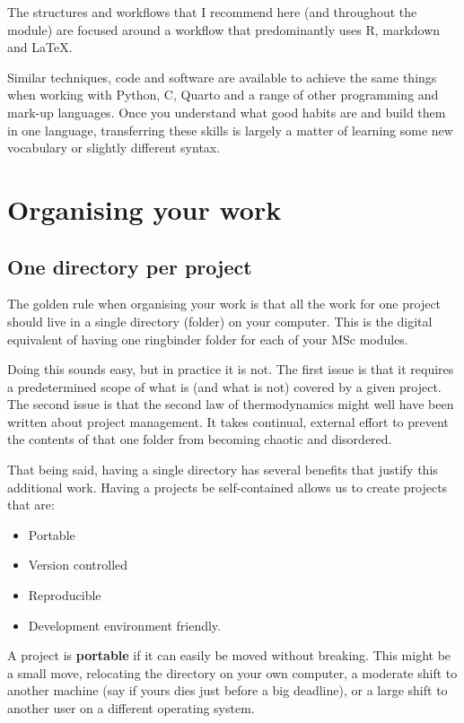\documentclass[
  12pt,
]{book}
\providecommand{\tightlist}{%
  \setlength{\itemsep}{0pt}\setlength{\parskip}{0pt}}
\theoremstyle{definition}
\theoremstyle{definition}
\theoremstyle{definition}
\theoremstyle{definition}
\theoremstyle{remark}
\begin{document}
The structures and workflows that I recommend here (and throughout the module) are focused around a workflow that predominantly uses R, markdown and LaTeX.

Similar techniques, code and software are available to achieve the same things when working with Python, C, Quarto and a range of other programming and mark-up languages. Once you understand what good habits are and build them in one language, transferring these skills is largely a matter of learning some new vocabulary or slightly different syntax.

\hypertarget{organising-your-work}{%
\section{Organising your work}\label{organising-your-work}}

\hypertarget{one-directory-per-project}{%
\subsection{One directory per project}\label{one-directory-per-project}}

The golden rule when organising your work is that all the work for one project should live in a single directory (folder) on your computer. This is the digital equivalent of having one ringbinder folder for each of your MSc modules.

Doing this sounds easy, but in practice it is not. The first issue is that it requires a predetermined scope of what is (and what is not) covered by a given project. The second issue is that the second law of thermodynamics might well have been written about project management. It takes continual, external effort to prevent the contents of that one folder from becoming chaotic and disordered.

That being said, having a single directory has several benefits that justify this additional work. Having a projects be self-contained allows us to create projects that are:

\begin{itemize}
\tightlist
\item
  Portable
\item
  Version controlled
\item
  Reproducible
\item
  Development environment friendly.
\end{itemize}

A project is \textbf{portable} if it can easily be moved without breaking. This might be a small move, relocating the directory on your own computer, a moderate shift to another machine (say if yours dies just before a big deadline), or a large shift to another user on a different operating system.
\end{document}

